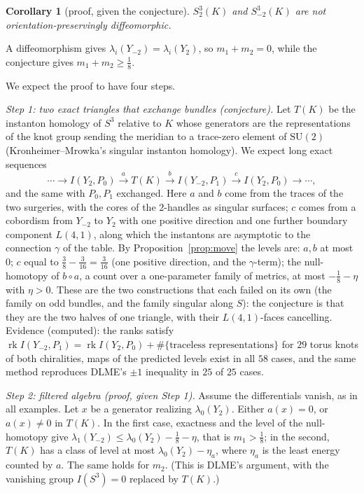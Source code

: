 \documentclass[10pt]{amsart}
\makeatletter
\numberwithin{equation}{section}
\theoremstyle{compact}
\newtheorem{corollary}[theorem]{Corollary}
\theoremstyle{definition}
\renewenvironment{proof}[1][\proofname]{\par\pushQED{\qed}\normalfont
  \topsep4\p@\relax\trivlist\item[\hskip\labelsep\itshape#1\@addpunct{.}]%
  \ignorespaces}{\popQED\endtrivlist\@endpefalse}
\newcommand{\SU}{\mathrm{SU}}
\newcommand{\st}[1]{\par\noindent\textit{#1}\enspace}
\makeatother
\begin{document}
\begin{corollary}[proof, given the conjecture]
$S^3_2(K)$ and $S^3_{-2}(K)$ are not orientation-preservingly
diffeomorphic.
\end{corollary}

\begin{proof}
A diffeomorphism gives $\lambda_i(Y_{-2})=\lambda_i(Y_2)$, so
$m_1+m_2=0$, while the conjecture gives $m_1+m_2\ge\frac18$.
\end{proof}

We expect the proof to have four steps.

\st{Step 1: two exact triangles that exchange bundles (conjecture).}
Let $T(K)$ be the instanton homology of $S^3$ relative to $K$ whose
generators are the representations of the knot group sending the meridian
to a trace-zero element of $\SU(2)$ (Kronheimer--Mrowka's singular instanton
homology). We expect long exact sequences
\[
\cdots\to I(Y_2,P_0)\xrightarrow{a}T(K)\xrightarrow{b}I(Y_{-2},P_1)
\xrightarrow{c}I(Y_2,P_0)\to\cdots,
\]
and the same with $P_0,P_1$ exchanged. Here $a$ and $b$ come from the traces
of the two surgeries, with the cores of the $2$-handles as singular surfaces;
$c$ comes from a cobordism from $Y_{-2}$ to $Y_2$ with one positive
direction and one further boundary component $L(4,1)$, along which the
instantons are asymptotic to the connection $\gamma$ of the table. By
Proposition~\ref{prop:move} the levels are: $a,b$ at most $0$; $c$ equal to
$\frac38-\frac3{16}=\frac3{16}$ (one positive direction, and the
$\gamma$-term); the null-homotopy of $b\circ a$, a count over a one-parameter
family of metrics, at most $-\frac18-\eta$ with $\eta>0$. These are the two constructions that each
failed on its own (the family on odd bundles, and the family singular
along $S$): the conjecture is that they are the two halves of one triangle,
with their $L(4,1)$-faces cancelling. Evidence (computed): the ranks satisfy
$\operatorname{rk}I(Y_{-2},P_1)=\operatorname{rk}I(Y_2,P_0)+
\#\{\text{traceless representations}\}$ for $29$ torus knots of both
chiralities, maps of the predicted levels exist in all $58$ cases, and the
same method reproduces DLME's $\pm1$ inequality in $25$ of $25$ cases.

\st{Step 2: filtered algebra (proof, given Step 1).} Assume the
differentials vanish, as in all examples. Let $x$ be a generator realizing
$\lambda_0(Y_2)$. Either $a(x)=0$, or $a(x)\ne0$ in $T(K)$. In the first
case, exactness and the level of the null-homotopy give
$\lambda_1(Y_{-2})\le\lambda_0(Y_2)-\frac18-\eta$, that is $m_1>\frac18$; in
the second, $T(K)$ has a class of level at most $\lambda_0(Y_2)-\eta_a$,
where $\eta_a$ is the least energy counted by $a$. The same holds for $m_2$. (This is DLME's argument, with the vanishing group
$I(S^3)=0$ replaced by $T(K)$.)
\end{document}
